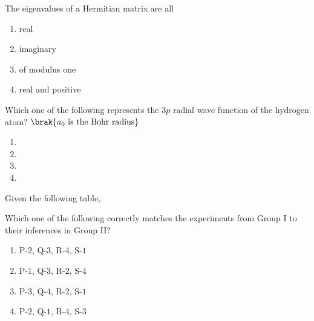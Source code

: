 \iffalse
                       
                        
                        
                        
                    
                        \author{AI24BTECH11006 - Bugada Roopansha}
                        \section{ph}
                        \chapter{2018}
                        \fi
 
   \item The eigenvalues of a Hermitian matrix are all
   \begin{enumerate}
       \item real
\item imaginary
\item of modulus one
\item  real and positive
   \end{enumerate}


\item Which one of the following represents the $3p$ radial wave function of the hydrogen atom? $\brak{a_0 \text{ is the Bohr radius}}$

\begin{enumerate}

\item

\item

\item

\item

\end{enumerate}



\item Given the following table,


Which one of the following correctly matches the experiments from Group I to their inferences in Group II?
\begin{enumerate}
    \item P-$2$, Q-$3$, R-$4$, S-$1$
    \item P-$1$, Q-$3$, R-$2$, S-$4$
    \item P-$3$, Q-$4$, R-$2$, S-$1$
    \item P-$2$, Q-$1$, R-$4$, S-$3$
\end{enumerate}

